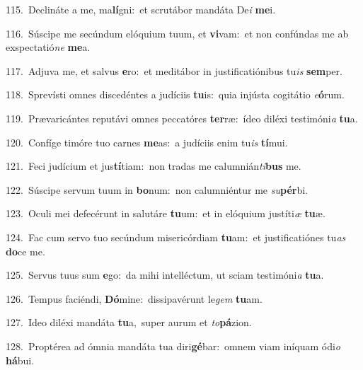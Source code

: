 {\numbfont\textcolor{\numbcolor}{115.}}~Declináte a me, ma\-\textbf{lí}\-gni:~\star et scrutábor mandáta De\textit{i} \textbf{me}\-i.\par
{\numbfont\textcolor{\numbcolor}{116.}}~Súscipe me secúndum elóquium tuum, et \textbf{vi}\-vam:~\star et non confúndas me ab exspectatió\textit{ne} \textbf{me}\-a.\par
{\numbfont\textcolor{\numbcolor}{117.}}~Adjuva me, et salvus \textbf{e}\-ro:~\star et meditábor in justificatiónibus tu\textit{is} \textbf{sem}\-per.\par
{\numbfont\textcolor{\numbcolor}{118.}}~Sprevísti omnes discedéntes a judíciis \textbf{tu}\-is:~\star quia injústa cogitátio \textit{e}\-\textbf{ó}rum.\par
{\numbfont\textcolor{\numbcolor}{119.}}~Prævaricántes reputávi omnes peccatóres \textbf{ter}\-ræ:~\star ídeo diléxi testimóni\textit{a} \textbf{tu}\-a.\par
{\numbfont\textcolor{\numbcolor}{120.}}~Confíge timóre tuo carnes \textbf{me}\-as:~\star a judíciis enim tu\textit{is} \textbf{tí}\-mui.\par
{\numbfont\textcolor{\numbcolor}{121.}}~Feci judícium et jus\-\textbf{tí}\-tiam:~\star non tradas me calumnián\-\textit{ti}\-\textbf{bus} me.\par
{\numbfont\textcolor{\numbcolor}{122.}}~Súscipe servum tuum in \textbf{bo}\-num:~\star non calumniéntur me \textit{su}\-\textbf{pér}bi.\par
{\numbfont\textcolor{\numbcolor}{123.}}~Oculi mei defecérunt in salutáre \textbf{tu}\-um:~\star et in elóquium justíti\textit{æ} \textbf{tu}\-æ.\par
{\numbfont\textcolor{\numbcolor}{124.}}~Fac cum servo tuo secúndum misericórdiam \textbf{tu}\-am:~\star et justificatiónes tu\textit{as} \textbf{do}\-ce me.\par
{\numbfont\textcolor{\numbcolor}{125.}}~Servus tuus sum \textbf{e}\-go:~\star da mihi intelléctum, ut sciam testimóni\textit{a} \textbf{tu}\-a.\par
{\numbfont\textcolor{\numbcolor}{126.}}~Tempus faciéndi, \textbf{Dó}\-mine:~\star dissipavérunt le\textit{gem} \textbf{tu}\-am.\par
{\numbfont\textcolor{\numbcolor}{127.}}~Ideo diléxi mandáta \textbf{tu}\-a,~\star super aurum et \textit{to}\-\textbf{pá}zion.\par
{\numbfont\textcolor{\numbcolor}{128.}}~Proptérea ad ómnia mandáta tua diri\-\textbf{gé}\-bar:~\star omnem viam iníquam ódi\textit{o} \textbf{há}\-bui.\par
